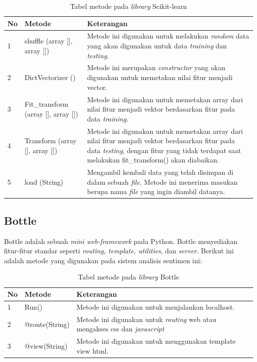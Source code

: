 \begin{small}
	\begin{longtable}{@{\extracolsep{\fill}}|p{0.5cm}|p{6cm}|p{6cm}|@{}}
		\caption{Tabel metode pada \textit{library} Scikit-learn}\\
		\hline
		\textbf{No} & \textbf{Metode} & \textbf{Keterangan} \\
		\hline
		\endhead
		1 & shuffle (array [], array []) & Metode ini digunakan untuk 
		melakukan \textit{random }data yang akan digunakan untuk data\textit{ 
			training }dan \textit{testing}. \\
		\hline
		2 & DictVectorizer () & Metode ini merupakan \textit{constructor} yang 
		akan digunakan untuk memetakan nilai fitur menjadi vector. \\
		\hline
		3 & Fit\_transform (array [], array []) & Metode ini digunakan 
		untuk memetakan array dari nilai fitur menjadi vektor berdasarkan fitur 
		pada data \textit{training}. \\
		\hline
		4 & Transform (array [], array []) & Metode ini digunakan untuk 
		memetakan array dari nilai fitur menjadi vektor berdasarkan fitur pada 
		data \textit{testing}, dengan fitur yang tidak terdapat saat 
		melakukan fit\_transform() akan diabaikan. \\
		\hline
		5 & load (String) & Mengambil kembali data yang telah disimpan di dalam 
		sebuah \textit{file}. Metode ini menerima masukan berupa nama 
		\textit{file} yang ingin diambil datanya. \\
		\hline
	\end{longtable}
\end{small}

\subsection{Bottle}
Bottle adalah sebuah \textit{mini web-framework} pada Python. Bottle 
menyediakan fitur-fitur standar seperti \textit{routing, template, 
	utilities}, dan \textit{server}. Berikut ini adalah metode yang 
digunakan pada sistem analisis sentimen ini:
\begin{table}[H]
	\caption{Tabel metode pada \textit{library} Bottle}
	\centering
	\small
	\begin{adjustbox}{width=1\textwidth}
	\begin{tabular}{|p{0.5cm}|p{6cm}|p{6cm}|}
		\hline
		\textbf{No} & \textbf{Metode} & \textbf{Keterangan} \\
		\hline
		1 & Run() & Metode ini digunakan untuk menjalankan localhost. \\
		\hline
		2 & @route(String) & Metode ini digunakan untuk \textit{routing} web 
		atau mengakses css dan \textit{javascript} \\
		\hline
		3 & @view(String) & Metode ini digunakan untuk menggunakan template view 
		html. \\
		\hline
	\end{tabular}
	\end{adjustbox}
\end{table}
\pagebreak
